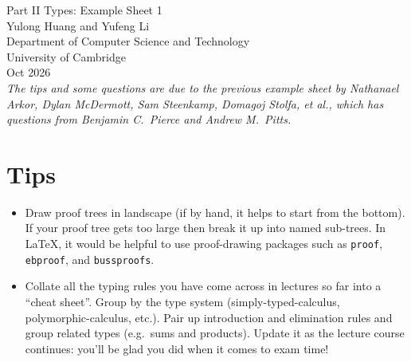 \documentclass[11pt,a4paper,twoside]{article}
\begin{document}
\begin{center}
  {\Huge Part II Types: Example Sheet 1}\\
  \vspace{1.0em}
  {\large Yulong Huang and Yufeng Li}\\
  \vspace{0.5em}
  {\small Department of Computer Science and Technology \\ University
  of Cambridge \\ Oct 2026}\\
  \vspace{1.0em}
  \small{\textit{The tips and some questions are due to the previous
      example sheet by Nathanael Arkor, Dylan McDermott, Sam  Steenkamp,
      Domagoj Stolfa, et al., which has questions from Benjamin C.~Pierce
  and Andrew M.~Pitts.}}
\end{center}

\section*{Tips}

\begin{itemize}

  \item Draw proof trees in landscape (if by hand, it helps to start
    from the bottom). If your proof tree gets
    too large then break it up into named sub-trees. In \LaTeX, it
    would be helpful to use proof-drawing packages such as
    \texttt{proof}, \texttt{ebproof}, and \texttt{bussproofs}.

  \item Collate all the typing rules you have come across in lectures
    so far into a ``cheat sheet''. Group by
    the type system (simply-typed-calculus, polymorphic-calculus,
    etc.). Pair up introduction and
    elimination rules and group related types (e.g.~sums and
    products). Update it as the lecture course
    continues: you’ll be glad you did when it comes to exam time!



\end{itemize}
\end{document}
